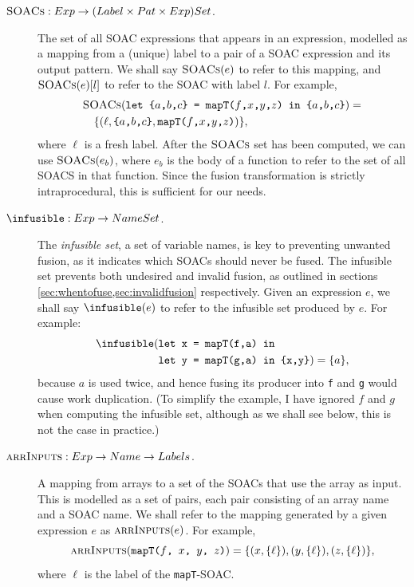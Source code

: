 \begin{description}
\item[$\textsc{SOACs} : Exp \rightarrow (Label \times Pat \times Exp) Set$.]
  The set of all SOAC expressions that appears in an expression,
  modelled as a mapping from a (unique) label to a pair of a SOAC
  expression and its output pattern.  We shall say $\textsc{SOACs}(e)$ to
  refer to this mapping, and $\textsc{SOACs}(e)[l]$ to refer to the SOAC with
  label $l$.  For example,
  \begin{align*}
  & \textsc{SOACs}(\texttt{let \{$a$,$b$,$c$\} = mapT($f$,$x$,$y$,$z$) in \{$a$,$b$,$c$\}}) =\\
  & \quad \{ (\ell, \texttt{\{$a$,$b$,$c$\}},\texttt{mapT($f$,$x$,$y$,$z$)}) \},
  \end{align*}
  where $\ell$ is a fresh label.  After the $\textsc{SOACs}$ set has been
  computed, we can use $\textsc{SOACs}(e_{b})$, where $e_{b}$ is the body of a
  function to refer to the set of all SOACS in that function.  Since
  the fusion transformation is strictly intraprocedural, this is
  sufficient for our needs.

\item[$\infusible : Exp \rightarrow Name Set$.] The \textit{infusible
    set}, a set of variable names, is key to preventing unwanted
  fusion, as it indicates which SOACs should never be fused.  The
  infusible set prevents both undesired and invalid fusion, as
  outlined in sections \cref{sec:whentofuse,sec:invalidfusion}
  respectively.  Given an \LO{} expression $e$, we shall say
  $\infusible(e)$ to refer to the infusible set produced by $e$.  For
  example:
  \begin{align*}
  \infusible(&\texttt{let x = mapT(f,a) in}\\
  &\texttt{let y = mapT(g,a) in \{x,y\}}) = \{a\},
  \end{align*}
  because $a$ is used twice, and hence fusing its producer into
  \texttt{f} and \texttt{g} would cause work duplication.  (To
  simplify the example, I have ignored $f$ and $g$ when computing the
  infusible set, although as we shall see below, this is not the case
  in practice.)

\item[$\textsc{arrInputs} : Exp \rightarrow Name \rightarrow Labels$.] A mapping from arrays to a set of the SOACs that use the array
  as input.  This is modelled as a set of pairs, each pair consisting
  of an array name and a SOAC name.  We shall refer to the mapping
  generated by a given expression $e$ as $\textsc{arrInputs}(e)$.  For example,
  \[
  \textsc{arrInputs}(\texttt{mapT($f$, $x$, $y$, $z$)}) = \{ (x, \{\ell\}), (y, \{\ell\}), (z, \{\ell\}) \},
  \]
  where $\ell$ is the label of the \texttt{mapT}-SOAC.


\end{description}
